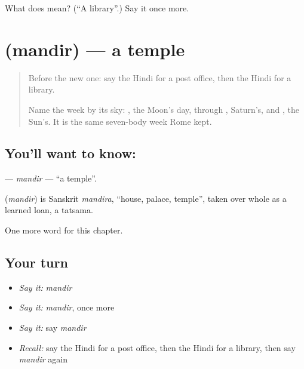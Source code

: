 \begin{tcolorbox}[breakable,colback=teal!4,colframe=teal!35!black,title={Before you move on}]
What does  mean? (\textquotedblleft{}A library\textquotedblright{}.) Say it once more.
\end{tcolorbox}
\section[\texorpdfstring{\hi{मंदिर} (mandir)}{मंदिर (mandir)}]{ (mandir) — a temple}

\label{lesson:HI-C152-mandir}



\begin{quote}
Before the new one: say the Hindi for a post office, then the Hindi for a library.

Name the week by its sky: \textbf{}, the Moon's day, through \textbf{}, Saturn's, and \textbf{}, the Sun's. It is the same seven-body week Rome kept.
\end{quote}

\subsection*{You'll want to know: }
\textbf{} — \emph{mandir} — \textquotedblleft{}a temple\textquotedblright{}.

\begin{cousinweb}
\textbf{} (\emph{mandir}) is Sanskrit \emph{mandira}, \textquotedblleft{}house, palace, temple\textquotedblright{}, taken over whole as a learned loan, a tatsama.
\end{cousinweb}

\begin{grammarlens}[title={What you've built}]
One more word for this chapter.
\end{grammarlens}

\subsection*{Your turn}
\begin{itemize}
\raggedright
  \item \emph{Say it:} \emph{mandir}
  \item \emph{Say it:} \emph{mandir}, once more
  \item \emph{Say it:} say \emph{mandir}
  \item \emph{Recall:} say the Hindi for a post office, then the Hindi for a library, then say \emph{mandir} again
\end{itemize}

